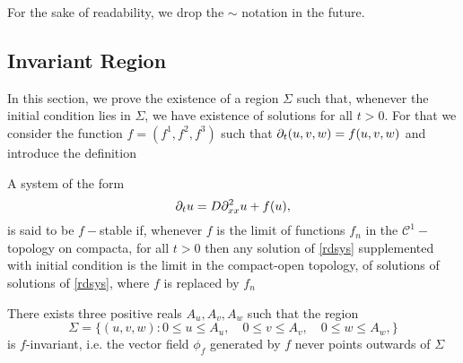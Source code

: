 For the sake of readability, we drop the $\sim$ notation in the future.

\subsection{Invariant Region}

In this section, we prove the existence of a region $\Sigma$ such that, whenever the initial condition lies in $\Sigma$, we have existence of solutions for all $t > 0$. For that we consider the function $f = (f^1, f^2, f^3)$ such that $\partial_t (u, v, w) = f(u, v, w)$ and introduce the definition

\begin{definition}
	A system of the form 
	\begin{equation}
		\label{rdsys}
		\partial_t u = D \partial_{xx}^2 u + f(u),
	\end{equation}
	 is said to be $f-$stable if, whenever $f$ is the limit of functions $f_n$ in the $\mathcal C^1-$topology on compacta, for all $t>0$ then any solution of \ref{rdsys} supplemented with initial condition is the limit in the compact-open topology, of solutions of solutions of \ref{rdsys}, where $f$ is replaced by $f_n$ 
\end{definition}

\begin{lemma}
	There exists three positive reals $A_u, A_v, A_w$ such that the region $$\Sigma = \bigl\{(u, v, w) : 0 \le u \le A_u, \quad 0 \le v \le A_v, \quad  0 \le w \le A_w, \bigr\}$$ is $f$-invariant, i.e. the vector field $\phi_f$ generated by $f$ never points outwards of $\Sigma$
\end{lemma}

